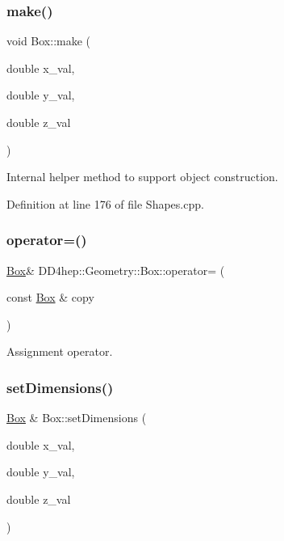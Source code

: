\subsubsection{\texorpdfstring{make()}{make()}}
{\footnotesize\ttfamily void Box\+::make (\begin{DoxyParamCaption}\item[{double}]{x\+\_\+val,  }\item[{double}]{y\+\_\+val,  }\item[{double}]{z\+\_\+val }\end{DoxyParamCaption})\hspace{0.3cm}{\ttfamily [protected]}}



Internal helper method to support object construction. 



Definition at line 176 of file Shapes.\+cpp.

\hypertarget{class_d_d4hep_1_1_geometry_1_1_box_a5f0ffbf8b4ebdc308349b96c4fa65018}{}\label{class_d_d4hep_1_1_geometry_1_1_box_a5f0ffbf8b4ebdc308349b96c4fa65018} 
\subsubsection{\texorpdfstring{operator=()}{operator=()}}
{\footnotesize\ttfamily \hyperlink{class_d_d4hep_1_1_geometry_1_1_box}{Box}\& D\+D4hep\+::\+Geometry\+::\+Box\+::operator= (\begin{DoxyParamCaption}\item[{const \hyperlink{class_d_d4hep_1_1_geometry_1_1_box}{Box} \&}]{copy }\end{DoxyParamCaption})\hspace{0.3cm}{\ttfamily [default]}}



Assignment operator. 

\hypertarget{class_d_d4hep_1_1_geometry_1_1_box_aa747479d055c62966ac21ac49355a2dc}{}\label{class_d_d4hep_1_1_geometry_1_1_box_aa747479d055c62966ac21ac49355a2dc} 
\subsubsection{\texorpdfstring{set\+Dimensions()}{setDimensions()}}
{\footnotesize\ttfamily \hyperlink{class_d_d4hep_1_1_geometry_1_1_box}{Box} \& Box\+::set\+Dimensions (\begin{DoxyParamCaption}\item[{double}]{x\+\_\+val,  }\item[{double}]{y\+\_\+val,  }\item[{double}]{z\+\_\+val }\end{DoxyParamCaption})}



